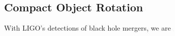 {\color{orange}

\subsection{Compact Object Rotation}

With LIGO's detections of black hole mergers, we are

}